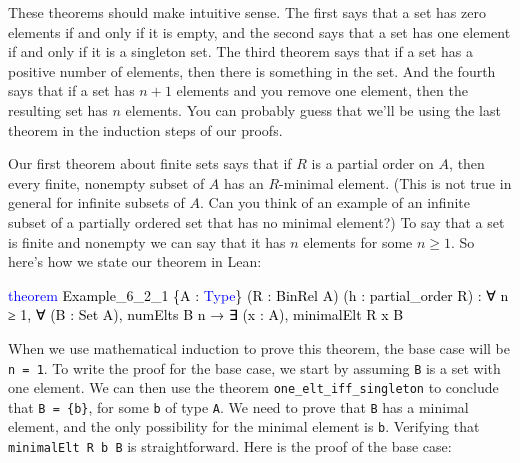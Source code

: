 \documentclass[
  letterpaper,
  DIV=11,
  numbers=noendperiod]{scrreprt}
\newenvironment{Shaded}{\begin{snugshade}}{\end{snugshade}}
\newcommand{\KeywordTok}[1]{\textcolor[rgb]{0.00,0.23,0.31}{#1}}
\newcommand{\NormalTok}[1]{\textcolor[rgb]{0.00,0.23,0.31}{#1}}
\renewcommand{\NormalTok}[1]{\textcolor[HTML]{000000}{#1}}
\renewcommand{\KeywordTok}[1]{\textcolor[HTML]{0000FF}{#1}}
\theoremstyle{remark}
\begin{document}
These theorems should make intuitive sense. The first says that a set
has zero elements if and only if it is empty, and the second says that a
set has one element if and only if it is a singleton set. The third
theorem says that if a set has a positive number of elements, then there
is something in the set. And the fourth says that if a set has \(n + 1\)
elements and you remove one element, then the resulting set has \(n\)
elements. You can probably guess that we'll be using the last theorem in
the induction steps of our proofs.

Our first theorem about finite sets says that if \(R\) is a partial
order on \(A\), then every finite, nonempty subset of \(A\) has an
\(R\)-minimal element. (This is not true in general for infinite subsets
of \(A\). Can you think of an example of an infinite subset of a
partially ordered set that has no minimal element?) To say that a set is
finite and nonempty we can say that it has \(n\) elements for some
\(n \ge 1\). So here's how we state our theorem in Lean:

\begin{Shaded}
\begin{Highlighting}[]
\KeywordTok{theorem}\NormalTok{ Example\_6\_2\_1 \{A : }\KeywordTok{Type}\NormalTok{\} (R : BinRel A) (h : partial\_order R) :}
\NormalTok{    ∀ n ≥ 1, ∀ (B : Set A), numElts B n →}
\NormalTok{      ∃ (x : A), minimalElt R x B}
\end{Highlighting}
\end{Shaded}

When we use mathematical induction to prove this theorem, the base case
will be \texttt{n\ =\ 1}. To write the proof for the base case, we start
by assuming \texttt{B} is a set with one element. We can then use the
theorem \texttt{one\_elt\_iff\_singleton} to conclude that
\texttt{B\ =\ \{b\}}, for some \texttt{b} of type \texttt{A}. We need to
prove that \texttt{B} has a minimal element, and the only possibility
for the minimal element is \texttt{b}. Verifying that
\texttt{minimalElt\ R\ b\ B} is straightforward. Here is the proof of
the base case:
\end{document}
